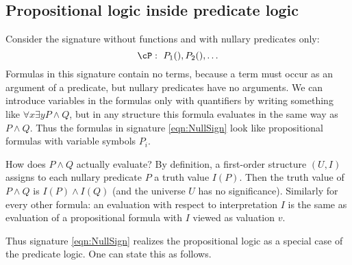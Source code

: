 

\setcounter{section}{1}
\setcounter{subsection}{5}
\setcounter{dfn}{14}

\subsection{Propositional logic inside predicate logic}
Consider the signature without functions and with nullary predicates only:
\begin{equation}
\label{eqn:NullSign}
\cP:\ P_1(), P_2(), \ldots
\end{equation}
Formulas in this signature contain no terms, because a term must occur as an argument of a predicate, but nullary predicates have no arguments.
We can introduce variables in the formulas only with quantifiers by writing something like $\forall x \exists y P \wedge Q$,
but in any structure this formula evaluates in the same way as $P \wedge Q$.
Thus the formulas in signature \eqref{eqn:NullSign} look like propositional formulas with variable symbols $P_i$.

How does $P \wedge Q$ actually evaluate?
By definition, a first-order structure $(U,I)$ assigns to each nullary predicate $P$ a truth value $I(P)$.
Then the truth value of $P \wedge Q$ is $I(P) \wedge I(Q)$ (and the universe $U$ has no significance).
Similarly for every other formula: an evaluation with respect to interpretation $I$ is the same as evaluation of a propositional formula
with $I$ viewed as valuation $v$.

Thus signature \eqref{eqn:NullSign} realizes the propositional logic as a special case of the predicate logic.
One can state this as follows.


